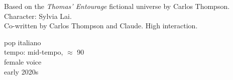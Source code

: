 

\begin{notes}
Based on the \emph{Thomas’ Entourage} fictional universe by Carlos Thompson.\\
Character: Sylvia Lai.\\
Co-written by Carlos Thompson and Claude. %
High interaction.
\end{notes}

\begin{style}
pop italiano\\
tempo: mid-tempo, \quarternote\(\approx\) 90\\
female voice\\
early 2020s
\end{style}

